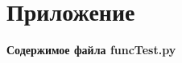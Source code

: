 \section{Приложение}
\textbf{Содержимое файла funcTest.py}
\inputminted{python}{source/funcTest.py}
